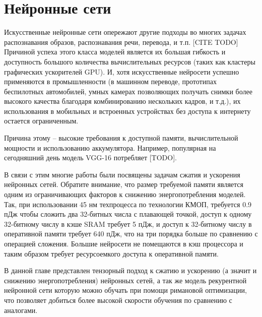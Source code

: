\chapter{Нейронные сети} \label{chap:tensornet}
Искусственные нейронные сети опережают другие подходы во многих задачах распознавания образов, распознавания речи, перевода, и т.п. [CITE TODO]
Причиной успеха этого класса моделей является их большая гибкость и доступность большого количества вычислительных ресурсов (таких как кластеры графических ускорителей GPU).
И, хотя искусственные нейросети успешно применяются в промышленности (в машинном переводе, прототипах беспилотных автомобилей, умных камерах позволяющих получать снимки более высокого качества благодаря комбинированию нескольких кадров, и т.д.), их использования в мобильных и встроенных устройствах без доступа к интернету остается ограниченным.

Причина этому -- высокие требования к доступной памяти, вычислительной мощности и использованию аккумулятора. Например, популярная на сегодняшний день модель VGG-16 потребляет [TODO].

В связи с этим многие работы были посвящены задачам сжатия и ускорения нейронных сетей. Обратите внимание, что размер требуемой памяти является одним из ограничивающих факторов к снижению энергопотребления моделей. Так, при использовании 45 нм техпроцесса по технологии КМОП, требуется 0.9 пДж чтобы сложить два 32-битных числа с плавающей точкой, доступ к одному 32-битному числу в кэше SRAM требует 5 пДж, и доступ к 32-битному числу в оперативной памяти требует 640 пДж, что на три порядка больше по сравнению с операцией сложения. Большие нейросети не помещаются в кэш процессора и таким образом требует ресурсоемкого доступа к оперативной памяти.

В данной главе представлен тензорный подход к сжатию и ускорению (а значит и снижению энергопотребления) нейронных сетей, а так же модель рекурентной нейронной сети которую можно обучать при помощи римановой оптимизации, что позволяет добиться более высокой скорости обучения по сравнению с аналогами.

